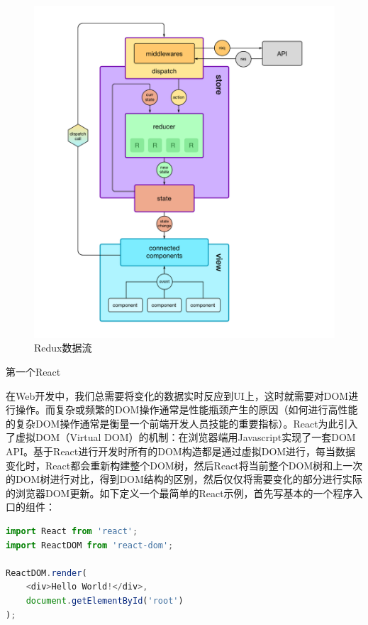 \documentclass[12pt]{book}
\makeatletter
\numberwithin{dummy}{section}
\theoremstyle{ocrenumbox}
\theoremstyle{blacknumex}
\theoremstyle{blacknumbox}
\theoremstyle{ocrenum}
\renewcommand{\subsection}{\@startsection {subsection}{2}{\z@}
	{-3ex \@plus -0.1ex \@minus -.4ex}
	{0.5ex \@plus.2ex }
	{\normalfont\sffamily\bfseries}}
\makeatother
\begin{document}
\begin{figure}[htbp]
	\centering
	\includegraphics[scale=0.3]{reduxdataflow.png}
	\caption{Redux数据流}
	\label{fig:reduxdataflow}
\end{figure}


\subsection{第一个React}

在Web开发中，我们总需要将变化的数据实时反应到UI上，这时就需要对DOM进行操作。而复杂或频繁的DOM操作通常是性能瓶颈产生的原因（如何进行高性能的复杂DOM操作通常是衡量一个前端开发人员技能的重要指标）。React为此引入了虚拟DOM（Virtual DOM）的机制：在浏览器端用Javascript实现了一套DOM API。基于React进行开发时所有的DOM构造都是通过虚拟DOM进行，每当数据变化时，React都会重新构建整个DOM树，然后React将当前整个DOM树和上一次的DOM树进行对比，得到DOM结构的区别，然后仅仅将需要变化的部分进行实际的浏览器DOM更新。如下定义一个最简单的React示例，首先写基本的一个程序入口的组件：

\begin{lstlisting}[language=Javascript]
import React from 'react';
import ReactDOM from 'react-dom';

ReactDOM.render(
	<div>Hello World!</div>,
	document.getElementById('root')
);
\end{lstlisting}
\end{document}
